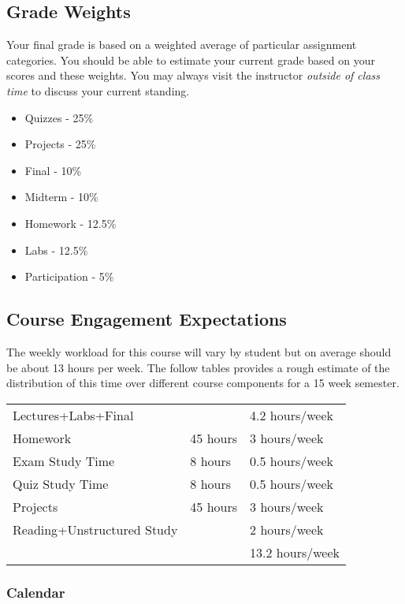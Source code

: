 \documentclass[10pt]{article}
\begin{document}
\subsection{Grade Weights}

Your final grade is based on a weighted average of particular assignment categories.  You should be able to estimate your current grade based on your scores and these weights.  You may always visit the instructor \textit{outside of class time} to discuss your current standing.  
\begin{itemize}
\item Quizzes - 25\%
\item Projects - 25\%
\item Final - 10\%
\item Midterm - 10\%
\item Homework - 12.5\%
\item Labs - 12.5\%
\item Participation - 5\%
\end{itemize}


\subsection{Course Engagement Expectations}

The weekly workload for this course will vary by student but on average should be about 13 hours per week.  The follow tables provides a rough estimate of the distribution of this time over different course components for a 15 week semester. 
\begin{center}
\begin{tabular}{|l|l|l|}
\hline
Lectures+Labs+Final &      & 4.2 hours/week \\ 
Homework & 45 hours        & 3 hours/week \\
Exam Study Time & 8 hours  & 0.5 hours/week \\ 
Quiz Study Time & 8 hours & 0.5 hours/week \\
Projects & 45 hours        & 3 hours/week \\
Reading+Unstructured Study & & 2 hours/week \\
\hline
& & 13.2 hours/week \\ 
\hline
\end{tabular}
\end{center}

\subsubsection{Calendar}
\end{document}
